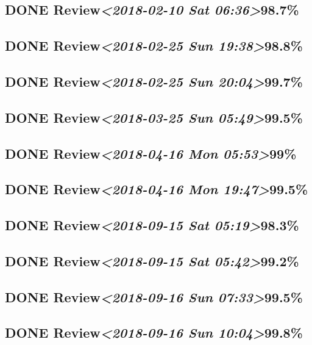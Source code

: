 \documentclass[11pt]{ctexart}
\begin{document}
\subsection{{\bfseries\sffamily DONE} Review\textit{<2018-02-10 Sat 06:36>}98.7\%}
\label{sec:org9615254}
\subsection{{\bfseries\sffamily DONE} Review\textit{<2018-02-25 Sun 19:38>}98.8\%}
\label{sec:org46da400}
\subsection{{\bfseries\sffamily DONE} Review\textit{<2018-02-25 Sun 20:04>}99.7\%}
\label{sec:orgf5ec6d0}
\subsection{{\bfseries\sffamily DONE} Review\textit{<2018-03-25 Sun 05:49>}99.5\%}
\label{sec:orgb90ac51}
\subsection{{\bfseries\sffamily DONE} Review\textit{<2018-04-16 Mon 05:53>}99\%}
\label{sec:org3456802}
\subsection{{\bfseries\sffamily DONE} Review\textit{<2018-04-16 Mon 19:47>}99.5\%}
\label{sec:orgdb4a943}
\subsection{{\bfseries\sffamily DONE} Review\textit{<2018-09-15 Sat 05:19>}98.3\%}
\label{sec:org9e1002c}
\subsection{{\bfseries\sffamily DONE} Review\textit{<2018-09-15 Sat 05:42>}99.2\%}
\label{sec:org5937b62}
\subsection{{\bfseries\sffamily DONE} Review\textit{<2018-09-16 Sun 07:33>}99.5\%}
\label{sec:org4e391c4}
\subsection{{\bfseries\sffamily DONE} Review\textit{<2018-09-16 Sun 10:04>}99.8\%}
\label{sec:orgf9de31e}
\end{document}
